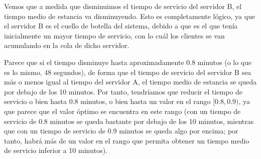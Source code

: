 \documentclass[11pt,a4paper]{article}
\begin{document}
Vemos que a medida que disminuimos el tiempo de servicio del servidor B, el tiempo medio de estancia
va disminuyendo. Esto es completamente lógico, ya que el servidor B es el cuello de botella del sistema, debido a que
es el que tenía inicialmente un mayor tiempo de servicio, con lo cuál los clientes se van acumulando
en la cola de dicho servidor.

Parece que si el tiempo disminuye hasta aproximadamente 0.8 minutos (o lo que es lo mismo, 48 segundos),
de forma que el tiempo de servicio del servidor B sea más o menos igual al tiempo del servidor A,
el tiempo medio de estancia se queda por debajo de los 10 minutos. Por tanto, tendríamos que reducir
el tiempo de servicio o bien hasta 0.8 minutos, o bien hasta un valor en el rango $[0.8, 0.9)$, ya que parece
que el valor óptimo se encuentra en este rango (con un tiempo de servicio de 0.8 minutos se queda bastante por debajo
de los 10 minutos, mientras que con un tiempo de servicio de 0.9 minutos se queda algo por encima; por tanto,
habrá más de un valor en el rango que permita obtener un tiempo medio de servicio inferior a 10 minutos).
\end{document}
